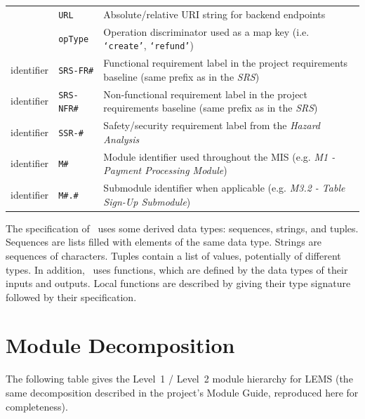 \documentclass[12pt, titlepage]{article}
\begin{document}
\begin{center}
\begin{tabular}{l l p{7.5cm}}
 & \texttt{URL} & Absolute/relative URI string for backend endpoints \\
 & \texttt{opType} & Operation discriminator used as a map key (i.e. \texttt{`create'}, \texttt{`refund'}) \\
identifier & \texttt{SRS-FR\#} & Functional requirement label in the project requirements baseline (same prefix as in the \textit{SRS}) \\
identifier & \texttt{SRS-NFR\#} & Non-functional requirement label in the project requirements baseline (same prefix as in the \textit{SRS}) \\
identifier & \texttt{SSR-\#} & Safety/security requirement label from the \textit{Hazard Analysis} \\
identifier & \texttt{M\#} & Module identifier used throughout the MIS (e.g. \textit{M1 - Payment Processing Module}) \\
identifier & \texttt{M\#.\#} & Submodule identifier when applicable (e.g. \textit{M3.2 - Table Sign-Up Submodule}) \\
\bottomrule
\end{tabular} 
\end{center}

\noindent
The specification of \progname \ uses some derived data types: sequences, strings, and
tuples. Sequences are lists filled with elements of the same data type. Strings
are sequences of characters. Tuples contain a list of values, potentially of
different types. In addition, \progname \ uses functions, which
are defined by the data types of their inputs and outputs. Local functions are
described by giving their type signature followed by their specification.

\section{Module Decomposition}

The following table gives the Level~1 / Level~2 module hierarchy for LEMS (the same decomposition described in the project's Module Guide, reproduced here for completeness).
\end{document}
